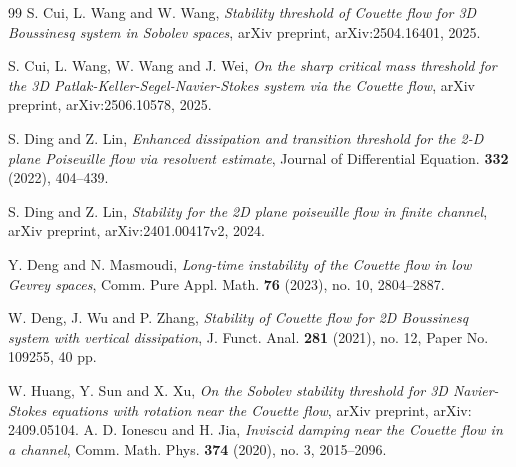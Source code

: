 \documentclass[reqno, 12pt]{amsart} %
\theoremstyle{plain} %
\theoremstyle{definition}
\theoremstyle{remark}
\numberwithin{equation}{section} %
\begin{document}
\begin{thebibliography}{99}
		S. Cui, L. Wang and W. Wang, 
		\textit{Stability threshold of Couette flow for 3D Boussinesq system in Sobolev spaces}, arXiv preprint, 
		arXiv:2504.16401, 2025.
		
		
		
		S. Cui, L. Wang, W. Wang and J. Wei, 
		\textit{On the sharp critical mass threshold for the 3D Patlak-Keller-Segel-Navier-Stokes system via the Couette flow}, arXiv preprint, 
		arXiv:2506.10578, 2025.
		
		S. Ding and Z. Lin, 
		\textit{Enhanced dissipation and transition threshold for the 2-D plane Poiseuille flow via resolvent estimate}, 
		Journal of Differential Equation. \textbf{332} (2022), 404–439.
		
		S. Ding and Z. Lin, 
		\textit{Stability for the 2D plane poiseuille flow in finite channel}, arXiv preprint,
		arXiv:2401.00417v2, 2024.
		
		Y. Deng and N. Masmoudi, 
		\textit{Long-time instability of the Couette flow in low Gevrey spaces}, 
		Comm. Pure Appl. Math. \textbf{76} (2023), no. 10, 2804–2887.
		
		W. Deng, J. Wu and P. Zhang, 
		\textit{Stability of Couette flow for 2D Boussinesq system with vertical dissipation}, 
		J. Funct. Anal. \textbf{281} (2021), no. 12, Paper No. 109255, 40 pp.
		
		  W. Huang, Y. Sun and X. Xu, \textit{On the Sobolev stability threshold for 3D Navier-Stokes equations with rotation near the Couette flow}, arXiv preprint, arXiv: 2409.05104.
		A. D. Ionescu and H. Jia, 
		\textit{Inviscid damping near the Couette flow in a channel}, 
		Comm. Math. Phys. \textbf{374} (2020), no. 3, 2015–2096.
		

\end{thebibliography}
\end{document}
